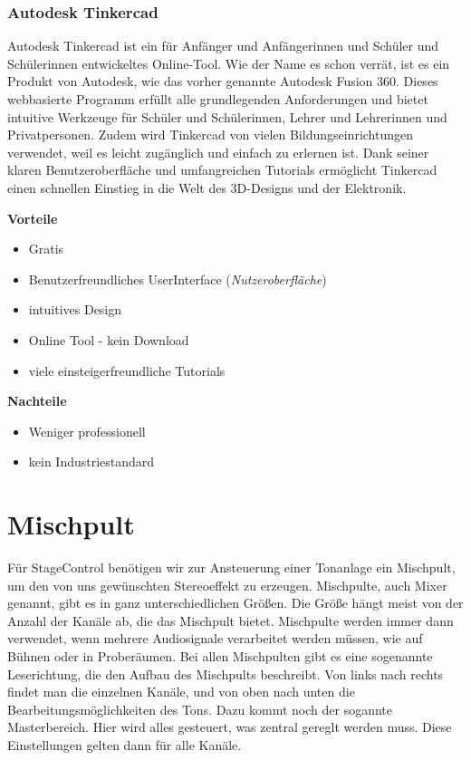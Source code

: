 \subsubsection{Autodesk Tinkercad}
Autodesk Tinkercad ist ein für Anfänger und Anfängerinnen und Schüler und Schülerinnen entwickeltes Online-Tool. Wie der Name es schon verrät, ist es ein Produkt von Autodesk, wie das vorher genannte Autodesk Fusion 360. Dieses webbasierte Programm erfüllt alle grundlegenden Anforderungen und bietet intuitive Werkzeuge für Schüler und Schülerinnen, Lehrer und Lehrerinnen und Privatpersonen. Zudem wird Tinkercad von vielen Bildungseinrichtungen verwendet, weil es leicht zugänglich und einfach zu erlernen ist. Dank seiner klaren Benutzeroberfläche und umfangreichen Tutorials ermöglicht Tinkercad einen schnellen Einstieg in die Welt des 3D-Designs und der Elektronik. \\
\textcite{Tinkercad}

\textbf{Vorteile}
\begin{itemize}
	\item Gratis
	\item Benutzerfreundliches UserInterface (\emph{Nutzeroberfläche})
	\item intuitives Design
	\item Online Tool - kein Download 	
	\item viele einsteigerfreundliche Tutorials 
\end{itemize}

\textbf{Nachteile}
\begin{itemize}
	\item Weniger professionell
	\item kein Industriestandard 
\end{itemize}
\textcite{TinkercadReviews}

\section{Mischpult}
 Für StageControl benötigen wir zur Ansteuerung einer Tonanlage ein Mischpult, um den von uns gewünschten Stereoeffekt zu erzeugen. Mischpulte, auch Mixer genannt, gibt es in ganz unterschiedlichen Größen. Die Größe hängt meist von der Anzahl der Kanäle ab, die das Mischpult bietet. Mischpulte werden immer dann verwendet, wenn mehrere Audiosignale verarbeitet werden müssen, wie auf Bühnen oder in Proberäumen. Bei allen Mischpulten gibt es eine sogenannte Leserichtung, die den Aufbau des Mischpults beschreibt. Von links nach rechts findet man die einzelnen Kanäle, und von oben nach unten die Bearbeitungsmöglichkeiten des Tons. Dazu kommt noch der sogannte Masterbereich. Hier wird alles gesteuert, was zentral gereglt werden muss. Diese Einstellungen gelten dann für alle Kanäle. \\
\textcite{MischpultInformation}  \textcite{MischpultMaster}

